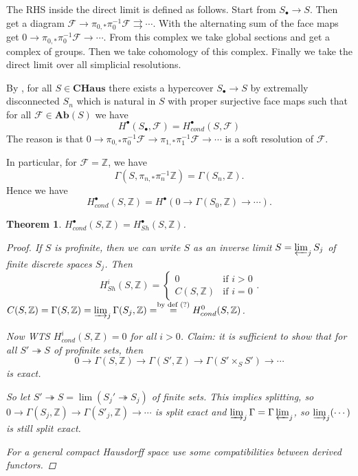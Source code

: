 \documentclass[12pt]{article}
\theoremstyle{darkgreentheorem}
\newtheorem{thm}{Theorem}[section]
\theoremstyle{darkbluedefinition}
\theoremstyle{darkredexample}
\theoremstyle{remark}
\newcommand{\Z}{\mathbb{Z}}
\newcommand{\1}{\mathbbm{1}}
\newcommand{\CHaus}{\mathbf{CHaus}}
\newcommand{\Ab}{\mathbf{Ab}}
\newcommand{\F}{\mathcal{F}}
\newcommand{\fp}[1]{\times_{#1}}
\newcommand{\grd}{^{\bullet}}
\begin{document}
The RHS inside the direct limit is defined as follows.
Start from $S_{\bullet}\to S$.
Then get a diagram $\F\to \pi_{0,*}\pi_{0}^{-1}\F\rightrightarrows \cdots $.
With the alternating sum of the face maps get $0\to \pi_{0,*}\pi_{0}^{-1}\F\to \cdots $.
From this complex we take global sections and get a complex of groups.
Then we take cohomology of this complex.
Finally we take the direct limit over all simplicial resolutions.

By \cite[Theorems 2.3, 3.10-11]{dyc76}, for all $S\in \CHaus$ there exists a hypercover $S_{\bullet}\to S$ by extremally disconnected $S_{n}$ which is natural in $S$ with proper surjective face maps such that for all $\F\in \Ab(S)$ we have
\[ H\grd(S_{\bullet},\F)=H\grd_{cond}(S,\F) \]
The reason is that $0\to \pi_{0,*}\pi_{0}^{-1}\F\to \pi_{1,*}\pi_{1}^{-1}\F\to \cdots $ is a soft resolution of $\F$.

In particular, for $\F=\Z$, we have
\[ \Gamma(S,\pi_{n,*}\pi_{n}^{-1}\Z)=\Gamma(S_{n},\Z). \]
Hence we have
\[ H_{cond}\grd(S,\Z)=H\grd(0\to \Gamma(S_{0},\Z)\to \cdots ).\]

\begin{thm}
    $H\grd_{cond}(S,\Z)=H\grd_{Sh}(S,\Z)$.
    \begin{proof}
	If $S$ is profinite, then we can write $S$ as an inverse limit $S=\varprojlim_{j} S_{j}$ of finite discrete spaces $S_{j}$.
	Then
	\[ H^{i}_{Sh}(S,\Z)=\begin{cases} 0 & \text{if } i>0 \\ C(S,\Z) & \text{if } i=0 \end{cases}. \]
	    \marginnote{\dbend}$C(S,\Z)=\Gamma(S,\Z)= \varinjlim_{j}\Gamma(S_{j},\Z)=\overset{\text{by def } (?)}{=} H^{0}_{cond}(S,\Z)$.
	
	Now WTS $H_{cond}^{i}(S,\Z)=0$ for all $i>0$.
	\marginnote{\dbend} Claim: it is sufficient to show that for all $S'\twoheadrightarrow S$ of profinite sets, then
	\[ 0\to \Gamma(S,\Z)\to \Gamma(S',\Z)\to \Gamma(S'\fp{S}S')\to \cdots \]
	is exact.

	So let $S'\twoheadrightarrow S=\lim(S_{j}'\twoheadrightarrow S_{j})$ of finite sets.
	This implies splitting, so $0\to \Gamma(S_{j},\Z)\to \Gamma(S'_{j},\Z)\to \cdots $ is split exact and $\varinjlim_{j}\Gamma=\Gamma \varprojlim_{j}$, so $\varinjlim_{j}(\cdots)$ is still split exact.
	
	For a general compact Hausdorff space use some compatibilities between derived functors.
    \end{proof}
\end{thm}
\end{document}
